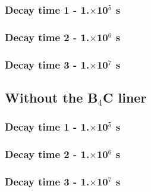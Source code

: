 \documentclass[12pt]{article}
\begin{document}
\subsubsection{Decay time 1 - 1.$\times$10$^5$ s}
\subsubsection{Decay time 2 - 1.$\times$10$^6$ s}
\subsubsection{Decay time 3 - 1.$\times$10$^7$ s}
\subsection{Without the B$_4$C liner}
\subsubsection{Decay time 1 - 1.$\times$10$^5$ s}
\subsubsection{Decay time 2 - 1.$\times$10$^6$ s}
\subsubsection{Decay time 3 - 1.$\times$10$^7$ s}
\end{document}
